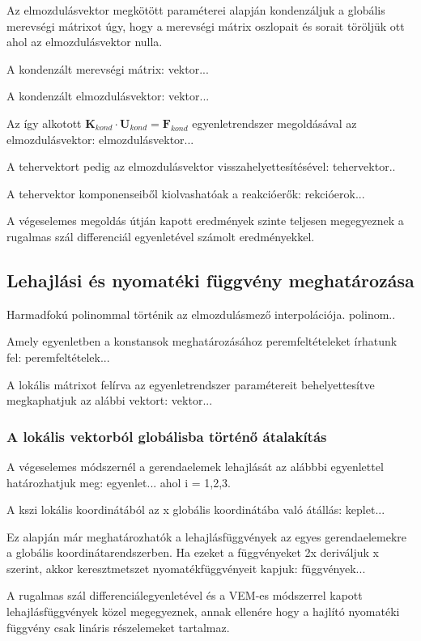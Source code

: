 \documentclass{article}
\begin{document}
		Az elmozdulásvektor megkötött paraméterei alapján kondenzáljuk a globális merevségi mátrixot úgy, hogy a merevségi mátrix oszlopait és sorait töröljük ott ahol az elmozdulásvektor nulla.
		
		A kondenzált merevségi mátrix:
		vektor...
		
		A kondenzált elmozdulásvektor:
		vektor...
		
		Az így alkotott $\textbf{K}_{kond}\cdot\textbf{U}_{kond}=\textbf{F}_{kond}$ egyenletrendszer megoldásával az elmozdulásvektor:
		elmozdulásvektor...
		
		A tehervektort pedig az elmozdulásvektor visszahelyettesítésével:
		tehervektor..
		
		A tehervektor komponenseiből kiolvashatóak a reakcióerők:
		rekcióerok...
		
		A végeselemes megoldás útján kapott eredmények szinte teljesen megegyeznek a rugalmas szál differenciál egyenletével számolt eredményekkel.
	\subsection{Lehajlási és nyomatéki függvény meghatározása}
		Harmadfokú polinommal történik az elmozdulásmező interpolációja.
		polinom..
		
		Amely egyenletben a konstansok meghatározásához peremfeltételeket írhatunk fel:
		peremfeltételek...
		
		A lokális mátrixot felírva az egyenletrendszer paramétereit behelyettesítve megkaphatjuk az alábbi vektort:
		vektor...
		
	\subsubsection{A lokális vektorból globálisba történő átalakítás}	
		A végeselemes módszernél a gerendaelemek lehajlását az alábbbi egyenlettel határozhatjuk meg:
		egyenlet...
		ahol i = 1,2,3.
		
		A kszi lokális koordinátából az x globális koordinátába való átállás:
		keplet...
		
		Ez alapján már meghatározhatók a lehajlásfüggvények az egyes gerendaelemekre a globális koordinátarendszerben.
		Ha ezeket a függvényeket 2x deriváljuk x szerint, akkor keresztmetszet nyomatékfüggvényeit kapjuk:
		függvények...
		
		A rugalmas szál differenciálegyenletével és a VEM-es módszerrel kapott lehajlásfüggvények közel megegyeznek, annak ellenére hogy a hajlító nyomatéki függvény csak lináris részelemeket tartalmaz.
		
\end{document}
